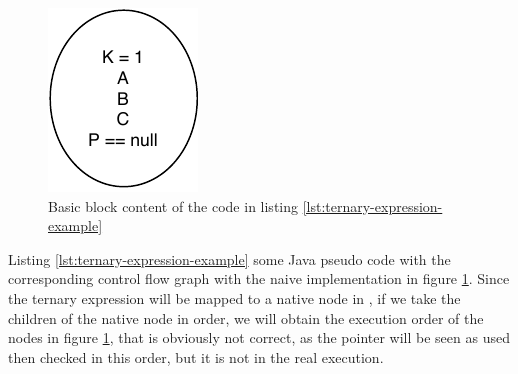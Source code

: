 \begin{figure}[h]
	\caption{Basic block content of the code in listing \ref{lst:ternary-expression-example}}
	\label{figure:basic-block-content}
	\includegraphics[]{figure/basic-block-content.pdf}
\end{figure}


Listing \ref{lst:ternary-expression-example} some Java pseudo code with the corresponding control flow graph with the naive implementation in figure \ref{figure:basic-block-content}.
Since the ternary expression will be mapped to a native node in \slang{}, if we take the children of the native node in order, we will obtain the execution order of the nodes in figure \ref{figure:basic-block-content}, that is obviously not correct, as the pointer will be seen as used then checked in this order, but it is not in the real execution.

